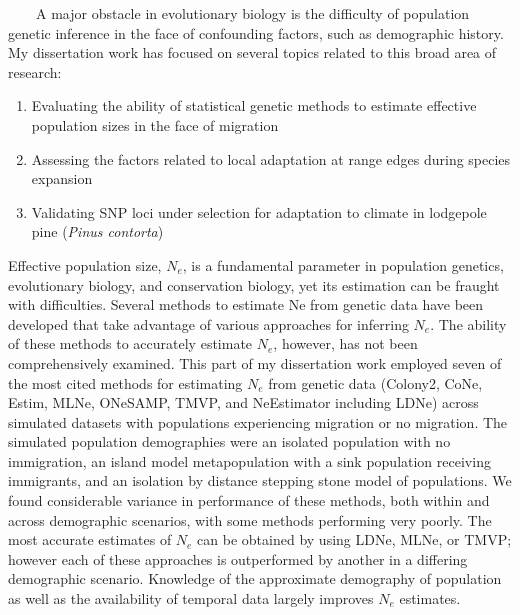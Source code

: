 \renewcommand{\thepage}{Dissertation Summary}


~~~~A major obstacle in evolutionary biology is the difficulty of population genetic inference in the face of confounding factors, such as demographic history. My dissertation work has focused on several topics related to this broad area of research:
\begin{enumerate}[nolistsep]
\item Evaluating the ability of statistical genetic methods to estimate effective population sizes in the face of migration \citep{Gilbert:2015io}
\item Assessing the factors related to local adaptation at range edges during species expansion
\item Validating SNP loci under selection for adaptation to climate in lodgepole pine (\emph{Pinus contorta})
\end{enumerate}

	Effective population size, $N_e$, is a fundamental parameter in population genetics, evolutionary biology, and conservation biology, yet its estimation can be fraught with difficulties. Several methods to estimate Ne from genetic data have been developed that take advantage of various approaches for inferring $N_e$. The ability of these methods to accurately estimate $N_e$, however, has not been comprehensively examined. This part of my dissertation work employed seven of the most cited methods for estimating $N_e$ from genetic data (Colony2, CoNe, Estim, MLNe, ONeSAMP, TMVP, and NeEstimator including LDNe) across simulated datasets with populations experiencing migration or no migration. The simulated population demographies were an isolated population with no immigration, an island model metapopulation with a sink population receiving immigrants, and an isolation by distance stepping stone model of populations. We found considerable variance in performance of these methods, both within and across demographic scenarios, with some methods performing very poorly. The most accurate estimates of $N_e$ can be obtained by using LDNe, MLNe, or TMVP; however each of these approaches is outperformed by another in a differing demographic scenario. Knowledge of the approximate demography of population as well as the availability of temporal data largely improves $N_e$ estimates.
	
